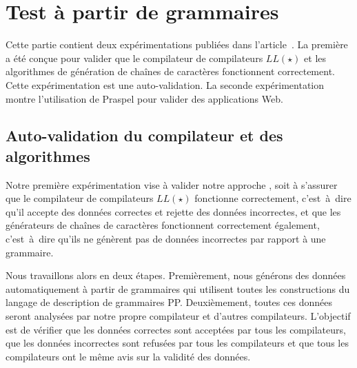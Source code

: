 \section{Test à partir de grammaires}
\label{section:experimentation:grammar}

Cette partie contient deux expérimentations publiées dans
l'article~. La première a été conçue pour valider que le
compilateur de compilateurs $LL(\star)$ et les algorithmes de génération de
chaînes de caractères fonctionnent correctement. Cette expérimentation est une
auto-validation. La seconde expérimentation montre l'utilisation de Praspel pour
valider des applications Web.

\subsection{Auto-validation du compilateur et des algorithmes}

Notre première expérimentation vise à valider notre approche
, soit à s'assurer que le compilateur de
compilateurs $LL(\star)$ fonctionne correctement, c'est~à~dire qu'il accepte des
données correctes et rejette des données incorrectes, et que les générateurs de
chaînes de caractères fonctionnent correctement également, c'est~à~dire qu'ils
ne génèrent pas de données incorrectes par rapport à une grammaire.

Nous travaillons alors en deux étapes. Premièrement, nous générons des données
automatiquement à partir de grammaires qui utilisent toutes les constructions du
langage de description de grammaires PP. Deuxièmement, toutes ces données seront
analysées par notre propre compilateur et d'autres compilateurs. L'objectif est
de vérifier que les données correctes sont acceptées par tous les compilateurs,
que les données incorrectes sont refusées par tous les compilateurs et que tous
les compilateurs ont le même avis sur la validité des données.

